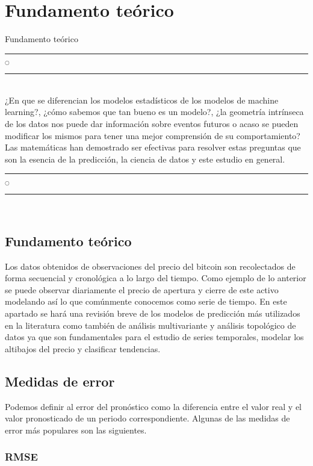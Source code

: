\chapter[Fundamento teórico]{Fundamento teórico}{Fundamento teórico}\label{Fundamento}

\noindent
\rule{0.49\textwidth}{0.75pt} $_{\bigcirc}$ \rule{0.49\textwidth}{0.75pt}\\

¿En que se diferencian los modelos estadísticos de los modelos de machine learning?, ¿cómo sabemos que tan bueno es un modelo?, ¿la geometría intrínseca de los datos nos puede dar información sobre eventos futuros o acaso se pueden modificar los mismos para tener una mejor comprensión de su comportamiento? Las matemáticas han demostrado ser efectivas para resolver estas preguntas que son la esencia de la predicción, la ciencia de datos y este estudio en general.
\\

\noindent
\rule{0.49\textwidth}{0.75pt} $_{\bigcirc}$ \rule{0.49\textwidth}{0.75pt}\\
\clearpage

\section{Fundamento teórico}

Los datos obtenidos de observaciones del precio del bitcoin son recolectados de forma secuencial y cronológica a lo largo del tiempo. Como ejemplo de lo anterior se puede observar diariamente el precio de apertura y cierre de este activo modelando así lo que comúnmente conocemos como serie de tiempo. En este apartado se hará una revisión breve de los modelos de predicción más utilizados en la literatura como también de análisis multivariante y análisis topológico de datos ya que son fundamentales para el estudio de series temporales, modelar los altibajos del precio y clasificar tendencias.

\section{Medidas de error}
Podemos definir al error del pronóstico como la diferencia entre el valor real y el valor pronosticado de un periodo correspondiente. Algunas de las medidas de error más populares son las siguientes.

\subsection{RMSE}

